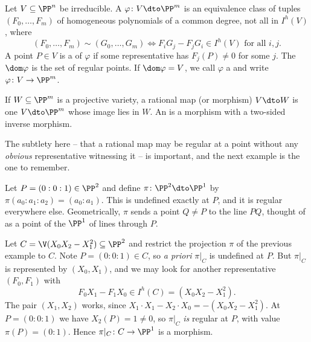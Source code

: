 \begin{definition}
	Let $V \subseteq \PP^n$ be irreducible. A  $\varphi \colon V \dto \PP^m$ is an equivalence class of tuples $(F_0,\dots,F_m)$ of homogeneous polynomials of a common degree, not all in $I^h(V)$, where
	$$(F_0,\dots,F_m) \sim (G_0,\dots,G_m) \iff F_iG_j - F_jG_i \in I^h(V) \text{ for all } i,j.$$
	A point $P \in V$ is a  of $\varphi$ if some representative has $F_j(P) \neq 0$ for some $j$. The  $\dom\varphi$ is the set of regular points. If $\dom\varphi = V$, we call $\varphi$ a  and write $\varphi \colon V \to \PP^m$.
\end{definition}

If $W \subseteq \PP^m$ is a projective variety, a rational map (or morphism) $V \dto W$ is one $V \dto \PP^m$ whose image lies in $W$. An  is a morphism with a two-sided inverse morphism.

The subtlety here -- that a rational map may be regular at a point without any \emph{obvious} representative witnessing it -- is important, and the next example is the one to remember.

\begin{example}\label{ex:projpoint}
	Let $P = (0:0:1) \in \PP^2$ and define $\pi \colon \PP^2 \dto \PP^1$ by $\pi(a_0:a_1:a_2) = (a_0:a_1)$. This is undefined exactly at $P$, and it is regular everywhere else. Geometrically, $\pi$ sends a point $Q \neq P$ to the line $PQ$, thought of as a point of the $\PP^1$ of lines through $P$.
\end{example}

\begin{example}\label{ex:conicP1}
	Let $C = \V(X_0X_2 - X_1^2) \subseteq \PP^2$ and restrict the projection $\pi$ of the previous example to $C$. Note $P = (0:0:1) \in C$, so \emph{a priori} $\pi|_C$ is undefined at $P$. But $\pi|_C$ is represented by $(X_0,X_1)$, and we may look for another representative $(F_0,F_1)$ with
	$$F_0X_1 - F_1X_0 \in I^h(C) = (X_0X_2 - X_1^2).$$
	The pair $(X_1,X_2)$ works, since $X_1 \cdot X_1 - X_2 \cdot X_0 = -(X_0X_2-X_1^2)$. At $P = (0:0:1)$ we have $X_2(P) = 1 \neq 0$, so $\pi|_C$ \emph{is} regular at $P$, with value $\pi(P) = (0:1)$. Hence $\pi|_C \colon C \to \PP^1$ is a morphism.
\end{example}

\begin{center}
\end{center}

